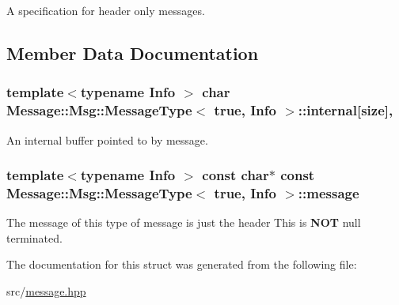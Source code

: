 A specification for header only messages. 

\subsection{Member Data Documentation}
\hypertarget{struct_message_1_1_msg_1_1_message_type_3_01true_00_01_info_01_4_ac84b1b4f1d2d30f0dbf5689ddc471955}{
\subsubsection[{internal}]{\setlength{\rightskip}{0pt plus 5cm}template$<$typename Info $>$ char {\bf Message\-::\-Msg\-::\-Message\-Type}$<$ true, Info $>$\-::internal\mbox{[}size\mbox{]}\hspace{0.3cm}{\ttfamily [static]}, {\ttfamily [private]}}}\label{struct_message_1_1_msg_1_1_message_type_3_01true_00_01_info_01_4_ac84b1b4f1d2d30f0dbf5689ddc471955}


An internal buffer pointed to by message. 

\hypertarget{struct_message_1_1_msg_1_1_message_type_3_01true_00_01_info_01_4_af95de5744fd55ef53ddc12587b4be239}{
\subsubsection[{message}]{\setlength{\rightskip}{0pt plus 5cm}template$<$typename Info $>$ const char$\ast$ const {\bf Message\-::\-Msg\-::\-Message\-Type}$<$ true, Info $>$\-::message\hspace{0.3cm}{\ttfamily [static]}}}\label{struct_message_1_1_msg_1_1_message_type_3_01true_00_01_info_01_4_af95de5744fd55ef53ddc12587b4be239}


The message of this type of message is just the header This is {\bfseries N\-O\-T} null terminated. 



The documentation for this struct was generated from the following file\-:\begin{DoxyCompactItemize}
\item 
src/\hyperlink{message_8hpp}{message.\-hpp}\end{DoxyCompactItemize}
